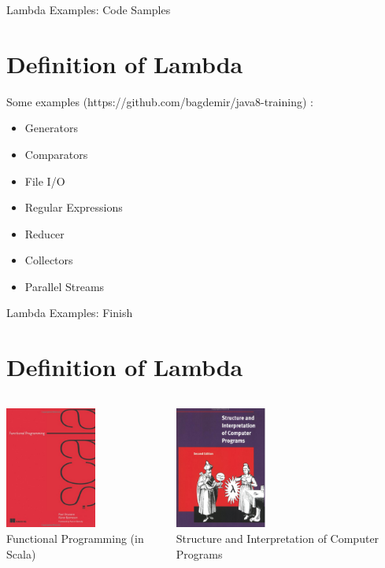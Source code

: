 \documentclass{beamer}
\begin{document}
	\begin{frame}[fragile]{Lambda Examples: Code Samples}
		\section{Definition of Lambda}

		Some examples (https://github.com/bagdemir/java8-training) : 
		\begin{itemize}
			\item Generators
			\item Comparators
			\item File I/O
			\item Regular Expressions
			\item Reducer
			\item Collectors
			\item Parallel Streams
		\end{itemize}		
	\end{frame}	
	
	\begin{frame}[fragile]{Lambda Examples: Finish}
		\section{Definition of Lambda}

	\begin{columns}
    	\begin{column}{0.5\textwidth}
			\vspace{0pt}
			\centering
			\includegraphics[width=3cm]{scalabook} \\
			Functional Programming (in Scala)\\
			
    	\end{column}
    	\begin{column}{0.5\textwidth}
			\vspace{0pt}
			\includegraphics[width=3cm]{lambdabook}	\\
			Structure and Interpretation of Computer Programs
	  		\end{column}
	\end{columns}
	\end{frame}	
			
\end{document}
